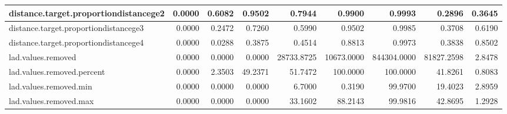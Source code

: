 \begin{table}[H]
{\begin{tabular}{|l|r|r|r|r|r|r|r|r|}
		distance.target.proportiondistancege2   & 0.0000                            & 0.6082                                & 0.9502                            & 0.7944                             & 0.9900                                & 0.9993                            & 0.2896                           & 0.3645                                   \\ \hline
		distance.target.proportiondistancege3   & 0.0000                            & 0.2472                                & 0.7260                            & 0.5990                             & 0.9502                                & 0.9985                            & 0.3708                           & 0.6190                                   \\ \hline
		distance.target.proportiondistancege4   & 0.0000                            & 0.0288                                & 0.3875                            & 0.4514                             & 0.8813                                & 0.9973                            & 0.3838                           & 0.8502                                   \\ \hline
		lad.values.removed                      & 0.0000                            & 0.0000                                & 0.0000                            & 28733.8725                         & 10673.0000                            & 844304.0000                       & 81827.2598                       & 2.8478                                   \\ \hline
		lad.values.removed.percent              & 0.0000                            & 2.3503                                & 49.2371                           & 51.7472                            & 100.0000                              & 100.0000                          & 41.8261                          & 0.8083                                   \\ \hline
		lad.values.removed.min                  & 0.0000                            & 0.0000                                & 0.0000                            & 6.7000                             & 0.3190                                & 99.9700                           & 19.4023                          & 2.8959                                   \\ \hline
		lad.values.removed.max                  & 0.0000                            & 0.0000                                & 0.0000                            & 33.1602                            & 88.2143                               & 99.9816                           & 42.8695                          & 1.2928                                   \\ \hline

\end{tabular}}
\end{table}
